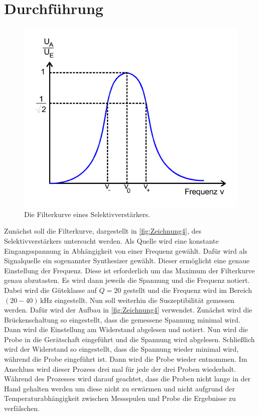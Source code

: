 \section{Durchführung}
\label{sec:Durchführung}
\begin{figure}
    \centering
    \includegraphics[width=0.8\linewidth]{pictures/Zeichnung3.pdf}
    \caption{Die Filterkurve eines Selektivverstärkers. \cite{v606}}
    \label{fig:Zeichnung3}
\end{figure}
Zunächst soll die Filterkurve, dargestellt in \autoref{fig:Zeichnung4}, des Selektivverstärkers untersucht werden.
Als Quelle wird eine konstante Eingangsspannung in Abhängigkeit von einer Frequenz gewählt.
Dafür wird als Signalquelle ein sogenannter Synthesizer gewählt.
Dieser ermöglicht eine genaue Einstellung der Frequenz.
Diese ist erforderlich um das Maximum der Filterkurve genau abzutasten.
Es wird dann jeweils die Spannung und die Frequenz notiert.
Dabei wird die Güteklasse auf $Q = 20$ gestellt und die Frequenz wird im Bereich $(20 - 40) \, \unit{\kilo\hertz}$ eingestellt.
Nun soll weiterhin die Suszeptibilität gemessen werden.
Dafür wird der Aufbau in \autoref{fig:Zeichnung4} verwendet.
Zunächst wird die Brückenschaltung so eingestellt, dass die gemessene Spannung minimal wird.
Dann wird die Einstellung am Widerstand abgelesen und notiert.
Nun wird die Probe in die Gerätschaft eingeführt und die Spannung wird abgelesen.
Schließlich wird der Widerstand so eingestellt, dass die Spannung wieder minimal wird, während die Probe eingeführt ist.
Dann wird die Probe wieder entnommen.
Im Anschluss wird dieser Prozess drei mal für jede der drei Proben wiederholt.
Während des Prozesses wird darauf geachtet, dass die Proben nicht lange in der Hand gehalten werden um diese nicht zu erwärmen
und nicht aufgrund der Temperaturabhängigkeit zwischen Messspulen und Probe die Ergebnisse zu verfälschen.

